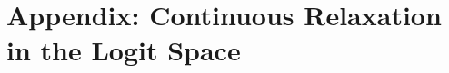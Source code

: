 \documentclass[acmsmall, review, anonymous]{acmart}\settopmatter{printfolios=true,printccs=false,printacmref=false}
\begin{document}



%
\balance



\appendix
\section{Appendix: Continuous Relaxation in the Logit Space}\label{app:appendix-logit}
\end{document}

